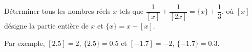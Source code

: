 \documentclass[varwidth]{standalone}
\begin{document}
    D\'eterminer tous les nombres r\'eels $x$ tels que $\dfrac{1}{[x]} + \dfrac{1}{[2x]} = \{ x \} + \dfrac{1}{3}$, o\`u $[x]$ d\'esigne la partie enti\`ere de $x$ et $\{ x \} = x - [x]$.

    Par exemple, $[2.5] = 2$, $\{ 2.5 \} = 0.5$ et $[-1.7] = -2$, $\{ -1.7 \} = 0.3$.
\end{document}

